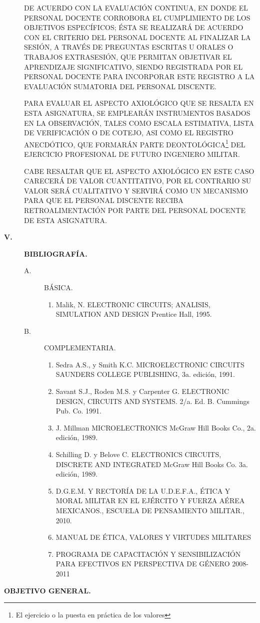 \documentclass{myarticle}
\begin{document}
\begin{description}
DE ACUERDO CON LA EVALUACIÓN CONTINUA, EN DONDE EL PERSONAL DOCENTE 
CORROBORA EL CUMPLIMIENTO DE LOS OBJETIVOS ESPECÍFICOS; ÉSTA SE REALIZARÁ 
DE ACUERDO CON EL CRITERIO DEL PERSONAL DOCENTE AL FINALIZAR LA SESIÓN, 
A TRAVÉS DE PREGUNTAS ESCRITAS U ORALES O TRABAJOS EXTRASESIÓN, QUE PERMITAN 
OBJETIVAR EL APRENDIZAJE SIGNIFICATIVO, SIENDO REGISTRADA POR EL PERSONAL 
DOCENTE PARA INCORPORAR ESTE REGISTRO A LA E\-VA\-LUA\-CIÓN SUMATORIA DEL 
PERSONAL DISCENTE.


PARA EVALUAR EL ASPECTO AXIOLÓGICO QUE SE RESALTA EN ESTA ASIGNATURA, SE 
EMPLEARÁN INSTRUMENTOS BASADOS EN LA OBSERVACIÓN, TALES COMO ESCALA 
ESTIMATIVA, LISTA DE VERIFICACIÓN O DE COTEJO, ASI COMO EL RE\-GIS\-TRO 
ANECDÓTICO, QUE FORMARÁN PARTE DEONTOLÓGICA\footnote{El ejercicio o la 
puesta en práctica de los valores} DEL EJERCICIO PROFESIONAL DE FUTURO 
INGENIERO MILITAR.

CABE RESALTAR QUE EL ASPECTO AXIOLÓGICO EN ESTE CASO CARECERÁ DE VALOR 
CUANTITATIVO, POR EL CONTRARIO SU VALOR SERÁ CUALITATIVO Y SERVIRÁ COMO 
UN ME\-CA\-NIS\-MO PARA QUE EL PERSONAL DISCENTE RECIBA RETROALIMENTACIÓN 
POR PARTE DEL PERSONAL DOCENTE DE ESTA ASIGNATURA.
\item[{\large{\bf V.}}] {\large{\bf BIBLIOGRAFÍA.}}
\begin{description}
\item[A.] BÁSICA.
\begin{enumerate}
\item Malik, N. ELECTRONIC CIRCUITS; ANALISIS, SIMULATION AND DESIGN 
Prentice Hall, 1995.
\end{enumerate}
\item[B.] COMPLEMENTARIA.
\begin{enumerate}
\item Sedra A.S., y Smith K.C. MICROELECTRONIC CIRCUITS SAUNDERS COLLEGE 
PUBLISHING, 3a. edición, 1991. 
\item Savant S.J., Roden M.S. y Carpenter G. ELECTRONIC DESIGN, CIRCUITS 
AND SYSTEMS. 2/a. Ed. B. Cummings Pub. Co. 1991.
\item J. Millman MICROELECTRONICS McGraw Hill Books Co., 2a. edición, 1989.
\item Schilling D. y Belove C. ELECTRONICS CIRCUITS, DISCRETE AND INTEGRATED 
McGraw Hill Books Co. 3a. edición, 1989.
\item D.G.E.M. Y RECTORÍA DE LA U.D.E.F.A., ÉTICA Y MORAL MILITAR EN EL 
EJÉRCITO Y FUERZA AÉREA MEXICANOS., ESCUELA DE PENSAMIENTO MILITAR., 2010.
\item MANUAL DE ÉTICA, VALORES Y VIRTUDES MILITARES
\item PROGRAMA DE CAPACITACIÓN Y SENSIBILIZACIÓN PARA EFECTIVOS EN 
PERSPECTIVA DE GÉNERO 2008-2011
\end{enumerate}
\end{description}
\end{description}
\eject
\begin{center}
{\bf OBJETIVO GENERAL.}
\end{center}
\end{document}
